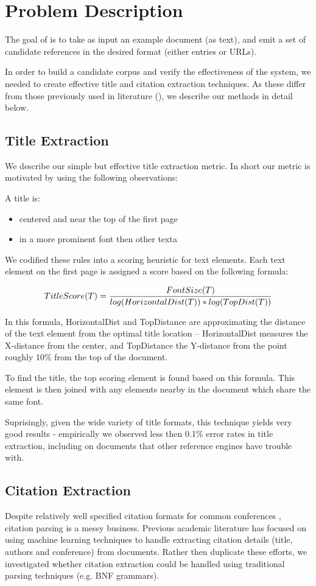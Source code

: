 \section{Problem Description}
The goal of \name is to take as input an example document (as text), and emit
a set of candidate references in the desired format (either \bibtex entries or 
URLs).

In order to build a candidate corpus and verify the effectiveness of the system,
we needed to create effective title and citation extraction techniques.  As 
these differ from those previously used in literature (\cite{citeseer}), we
describe our methods in detail below.

\subsection{Title Extraction}
We describe our simple but effective title extraction metric.  In
short our metric is motivated by using the following observations:

A title is:
\begin{itemize}
\item centered and near the top of the first page
\item in a more prominent font then other texta
\end{itemize}

We codified these rules into a scoring heuristic for text elements.  Each text
element on the first page is assigned a score based on the following formula:

\[
  TitleScore(T) = {FontSize(T) \over log(HorizontalDist(T)) * log(TopDist(T)) }
\]

In this formula, HorizontalDist and TopDistance are approximating the distance
of the text element from the optimal title location -- HorizontalDist
measures the X-distance from the center, and TopDistance 
the Y-distance from the point roughly 10\% from the top of the document.

To find the title, the top scoring element is found based on this formula.  This
element is then joined with any elements nearby in the document which share the
same font.

Suprisingly, given the wide variety of title formats, this technique yields 
very good results - empirically we observed less then 0.1\% error rates in 
title extraction, including on documents that other reference engines have
trouble with.

\subsection{Citation Extraction}
Despite relatively well specified citation formats for common conferences
\cite{acm}, citation parsing is a messy business.  Previous academic literature
has focused on using machine learning techniques \cite{citeseer} to handle extracting citation
details (title, authors and conference) from documents.  Rather then duplicate
these efforts, we investigated whether citation extraction could be handled using
traditional parsing techniques (e.g. BNF grammars).

